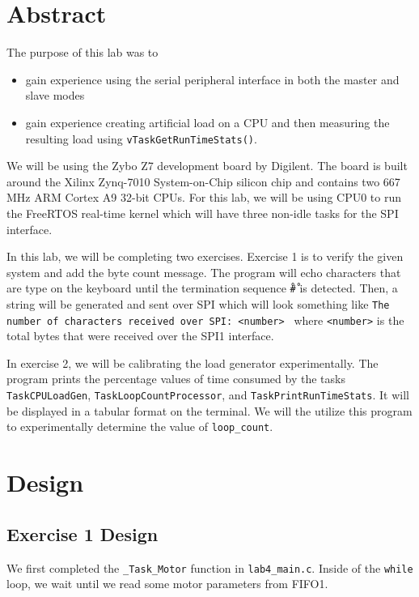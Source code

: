 \documentclass[11pt, letterpaper, titlepage]{article}
\title{\textbf{\Huge{ 
\begin{center}
ECE 315 Lab 4%
\end{center} 
}}}
\author{Lora Ma \\ Benjamin Kong \\ \\ECE 315 Lab Section H41}
\begin{document}
\maketitle
\thispagestyle{empty}
\tableofcontents 
\newpage
{}

\section{Abstract}
The purpose of this lab was to 
\begin{itemize}
  \item gain experience using the serial peripheral interface in both the master and slave modes
  \item gain experience creating artificial load on a CPU and then measuring the resulting load using \texttt{vTaskGetRunTimeStats()}.
\end{itemize}
We will be using the Zybo Z7 development board by Digilent. The board is built around the Xilinx Zynq-7010 System-on-Chip silicon chip and contains two 667 MHz ARM Cortex A9 32-bit CPUs. For this lab, we will be using CPU0 to run the FreeRTOS real-time kernel which will have three non-idle tasks for the SPI interface. 

In this lab, we will be completing two exercises. Exercise 1 is to verify the given system and add the byte count message. The program will echo characters that are type on the keyboard until the termination sequence \texttt{\r#\r} is detected. Then, a string will be generated and sent over SPI which will look something like \texttt{The number of characters received over SPI: <number> \n} where \texttt{<number>} is the total bytes that were received over the SPI1 interface.

In exercise 2, we will be calibrating the load generator experimentally. The program prints the percentage values of time consumed by the tasks \texttt{TaskCPULoadGen}, \texttt{TaskLoopCountProcessor}, and \texttt{TaskPrintRunTimeStats}. It will be displayed in a tabular format on the terminal. We will the utilize this program to experimentally determine the value of \texttt{loop_count}. 

\section{Design}

\subsection{Exercise 1 Design}
We first completed the \texttt{_Task_Motor} function in \texttt{lab4_main.c}. Inside of the \texttt{while} loop, we wait until we read some motor parameters from FIFO1.
\end{document}
